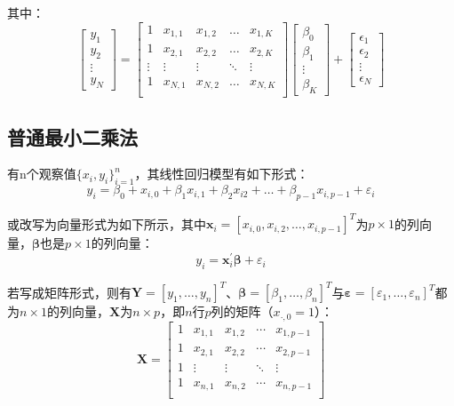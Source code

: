 \documentclass[11pt]{article}
\begin{document}
其中：
\begin{equation*}
    \begin{bmatrix}
        y_1 \\
        y_2 \\
        \vdots \\
        y_N
    \end{bmatrix} =
    \begin{bmatrix}
        1 & x_{1,1} & x_{1,2} & \dots & x_{1,K} \\
        1 & x_{2,1} & x_{2,2} & \dots & x_{2,K} \\
        \vdots & \vdots & \vdots & \ddots & \vdots \\
        1 & x_{N,1} & x_{N,2} & \dots & x_{N,K} \\
    \end{bmatrix}
    \begin{bmatrix}
        \beta_0 \\
        \beta_1 \\
        \vdots \\
        \beta_K
    \end{bmatrix} + 
    \begin{bmatrix}
        \epsilon_1 \\
        \epsilon_2 \\
        \vdots \\
        \epsilon_N
    \end{bmatrix}
\end{equation*}

\subsection{普通最小二乘法}

有n个观察值$\{x_i,y_i\}_{i=1}^{n}$，其线性回归模型有如下形式：
\begin{equation*}
    y_i = \beta_0 + x_{i,0} + \beta_1 x_{i,1} + \beta_2 x_{i2} + \dots + \beta_{p-1} x_{i,p-1} + \varepsilon_{i}
\end{equation*}

或改写为向量形式为如下所示，其中$\bm{x}_i = [x_{i,0},x_{i,2},\dots,x_{i,p-1}]^{T}$为$p\times 1$的列向量，$\bm{\beta}$也是$p \times 1$的列向量：
\begin{equation*}
    y_i = \bm{x}_{i}^{'} \bm{\beta} + \varepsilon_i
\end{equation*}

若写成矩阵形式，则有$\bm{Y}=[y_1,\dots,y_n]^{T}$、$\bm{\beta}=[\beta_1,\dots,\beta_n]^{T}$与$\bm{\varepsilon}=[\varepsilon_1,\dots,\varepsilon_n]^{T}$都为$n\times 1$的列向量，$\bm{X}$为$n\times p$，即$n$行$p$列的矩阵（$x_{\cdot,0}=1$）：
\begin{equation*}
    \bm{X} =
    \begin{bmatrix}
        1 & x_{1,1} & x_{1,2} & \cdots & x_{1,p-1} \\
        1 & x_{2,1} & x_{2,2} & \cdots & x_{2,p-1} \\
        1 & \vdots  & \vdots  & \ddots & \vdots    \\
        1 & x_{n,1} & x_{n,2} & \cdots & x_{n,p-1} \\
    \end{bmatrix}
\end{equation*}
\end{document}
